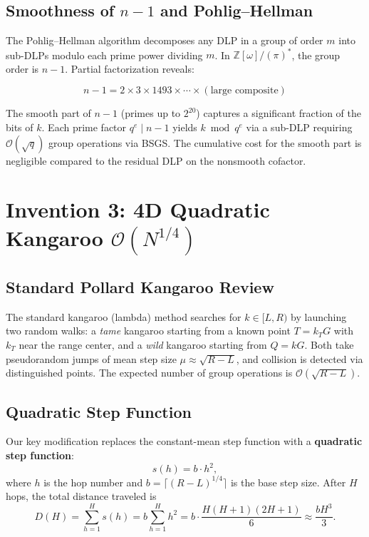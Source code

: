 \documentclass[11pt,a4paper]{article}
\theoremstyle{definition}
\newcommand{\Zomega}{\mathbb{Z}[\omega]}
\newcommand{\bigO}{\mathcal{O}}
\begin{document}
\subsection{Smoothness of $n - 1$ and Pohlig--Hellman}

The Pohlig--Hellman algorithm decomposes any DLP in a group of order $m$ into sub-DLPs modulo each prime power dividing $m$. In $\Zomega/(\pi)^*$, the group order is $n - 1$. Partial factorization reveals:

\begin{equation}
n - 1 = 2 \times 3 \times 1493 \times \cdots \times (\text{large composite})
\end{equation}

The smooth part of $n - 1$ (primes up to $2^{20}$) captures a significant fraction of the bits of $k$. Each prime factor $q^e \mid n-1$ yields $k \bmod q^e$ via a sub-DLP requiring $\bigO(\sqrt{q})$ group operations via BSGS. The cumulative cost for the smooth part is negligible compared to the residual DLP on the nonsmooth cofactor.


\section{Invention 3: 4D Quadratic Kangaroo $\bigO(N^{1/4})$}\label{sec:kangaroo}

\subsection{Standard Pollard Kangaroo Review}

The standard kangaroo (lambda) method searches for $k \in [L, R)$ by launching two random walks: a \textit{tame} kangaroo starting from a known point $T = k_T G$ with $k_T$ near the range center, and a \textit{wild} kangaroo starting from $Q = kG$. Both take pseudorandom jumps of mean step size $\mu \approx \sqrt{R - L}$, and collision is detected via distinguished points. The expected number of group operations is $\bigO(\sqrt{R - L})$.

\subsection{Quadratic Step Function}

Our key modification replaces the constant-mean step function with a \textbf{quadratic step function}:
\begin{equation}\label{eq:quad-step}
s(h) = b \cdot h^2,
\end{equation}
where $h$ is the hop number and $b = \lceil (R - L)^{1/4} \rceil$ is the base step size. After $H$ hops, the total distance traveled is
\begin{equation}
D(H) = \sum_{h=1}^{H} s(h) = b \sum_{h=1}^{H} h^2 = b \cdot \frac{H(H+1)(2H+1)}{6} \approx \frac{bH^3}{3}.
\end{equation}
\end{document}
